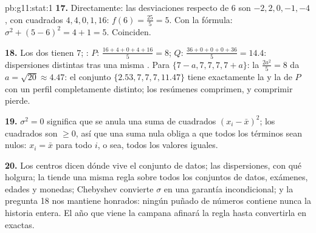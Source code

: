 \begin{solution}{pb:g11:stat:1}
\textbf{17.} Directamente: las desviaciones respecto de $6$ son
$-2, 2, 0, -1, -4$, con cuadrados $4, 4, 0, 1, 16$:
$f(6) = \frac{25}{5} = 5$. Con la fórmula:
$\sigma^2 + (5 - 6)^2 = 4 + 1 = 5$. Coinciden.

\textbf{18.} Los dos tienen  $7$; : $P$:
$\frac{16 + 4 + 0 + 4 + 16}{5} = 8$; $Q$:
$\frac{36 + 0 + 0 + 0 + 36}{5} = 14.4$: dispersiones distintas tras una
misma . Para $\{7 - a, 7, 7, 7, 7 + a\}$: la 
$\frac{2a^2}{5} = 8$ da $a = \sqrt{20} \approx 4.47$: el conjunto
$\{2.53, 7, 7, 7, 11.47\}$ tiene exactamente la  y la  de
$P$ con un perfil completamente distinto; los resúmenes comprimen, y
comprimir pierde.

\textbf{19.} $\sigma^2 = 0$ significa que se anula una suma de cuadrados
$(x_i - \bar x)^2$; los cuadrados son $\geq 0$, así que una suma nula
obliga a que todos los términos sean nulos: $x_i = \bar x$ para todo $i$,
o sea, todos los valores iguales.

\textbf{20.} Los centros dicen dónde vive el conjunto de datos; las
dispersiones, con qué holgura; la  tiende una misma regla
sobre todos los conjuntos de datos, exámenes, edades y monedas; Chebyshev
convierte $\sigma$ en una garantía incondicional; y la pregunta 18 nos
mantiene honrados: ningún puñado de números contiene nunca la historia
entera. El año que viene la campana afinará la regla hasta convertirla en
 exactas.
\end{solution}
